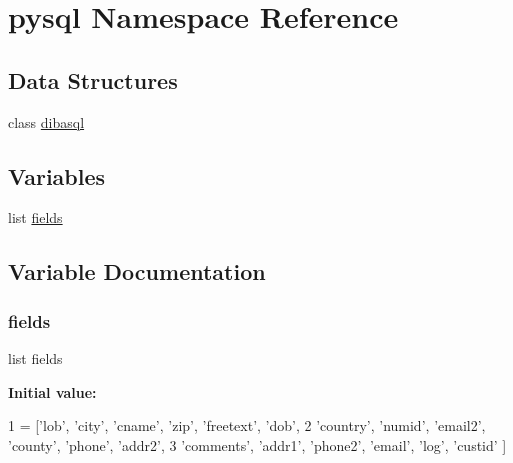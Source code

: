 \hypertarget{namespacepysql}{}\section{pysql Namespace Reference}
\label{namespacepysql}
\subsection*{Data Structures}
\begin{DoxyCompactItemize}
\item 
class \hyperlink{classpysql_1_1dibasql}{dibasql}
\end{DoxyCompactItemize}
\subsection*{Variables}
\begin{DoxyCompactItemize}
\item 
list \hyperlink{namespacepysql_a95a6920fe0e5c16303574629629ce2c1}{fields}
\end{DoxyCompactItemize}


\subsection{Variable Documentation}
\mbox{\label{namespacepysql_a95a6920fe0e5c16303574629629ce2c1}} 
\subsubsection{\texorpdfstring{fields}{fields}}
{\footnotesize\ttfamily list fields}

{\bfseries Initial value\+:}
\begin{DoxyCode}
1 =  [\textcolor{stringliteral}{'lob'},  \textcolor{stringliteral}{'city'}, \textcolor{stringliteral}{'cname'}, \textcolor{stringliteral}{'zip'}, \textcolor{stringliteral}{'freetext'}, \textcolor{stringliteral}{'dob'}, 
2         \textcolor{stringliteral}{'country'}, \textcolor{stringliteral}{'numid'}, \textcolor{stringliteral}{'email2'}, \textcolor{stringliteral}{'county'}, \textcolor{stringliteral}{'phone'}, \textcolor{stringliteral}{'addr2'},
3         \textcolor{stringliteral}{'comments'}, \textcolor{stringliteral}{'addr1'}, \textcolor{stringliteral}{'phone2'}, \textcolor{stringliteral}{'email'}, \textcolor{stringliteral}{'log'}, \textcolor{stringliteral}{'custid'} ]
\end{DoxyCode}
